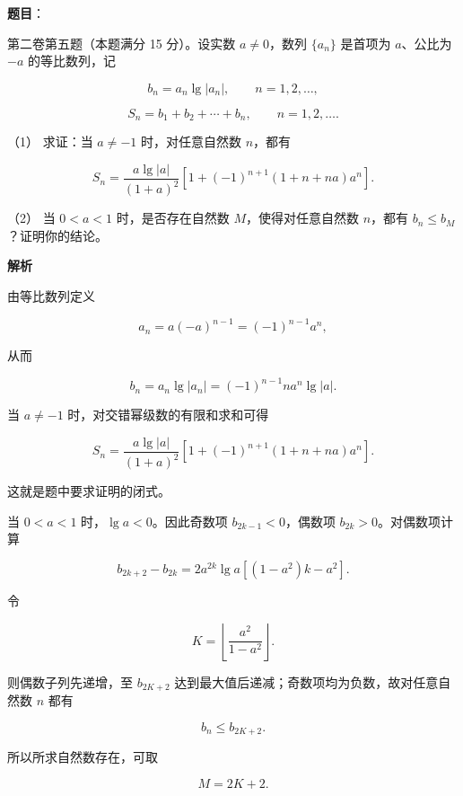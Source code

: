 \begin{answer}

\textbf{题目}：

第二卷第五题（本题满分 15 分）。设实数 $a\ne0$，数列 $\{a_n\}$ 是首项为 $a$、公比为 $-a$ 的等比数列，记

\nopagebreak[4]
\[
b_n=a_n\lg|a_n|,\qquad n=1,2,\ldots,
\]

\nopagebreak[4]
\[
S_n=b_1+b_2+\cdots+b_n,\qquad n=1,2,\ldots.
\]

（1） 求证：当 $a\ne-1$ 时，对任意自然数 $n$，都有

\nopagebreak[4]
\[
S_n=\frac{a\lg|a|}{(1+a)^2}
\left[1+(-1)^{n+1}(1+n+na)a^n\right].
\]

（2） 当 $0<a<1$ 时，是否存在自然数 $M$，使得对任意自然数 $n$，都有 $b_n\leq b_M$？证明你的结论。

\textbf{解析}


由等比数列定义

\nopagebreak[4]
\[
a_n=a(-a)^{n-1}=(-1)^{n-1}a^n,
\]

从而

\nopagebreak[4]
\[
b_n=a_n\lg|a_n|
=(-1)^{n-1}na^n\lg|a|.
\]

当 $a\ne-1$ 时，对交错幂级数的有限和求和可得

\nopagebreak[4]
\[
S_n=\frac{a\lg|a|}{(1+a)^2}
\left[1+(-1)^{n+1}(1+n+na)a^n\right].
\]

这就是题中要求证明的闭式。


当 $0<a<1$ 时，$\lg a<0$。因此奇数项 $b_{2k-1}<0$，偶数项 $b_{2k}>0$。对偶数项计算

\nopagebreak[4]
\[
b_{2k+2}-b_{2k}
=2a^{2k}\lg a\left[(1-a^2)k-a^2\right].
\]

令

\nopagebreak[4]
\[
K=\left\lfloor\frac{a^2}{1-a^2}\right\rfloor.
\]

则偶数子列先递增，至 $b_{2K+2}$ 达到最大值后递减；奇数项均为负数，故对任意自然数 $n$ 都有

\nopagebreak[4]
\[
b_n\le b_{2K+2}.
\]

所以所求自然数存在，可取

\nopagebreak[4]
\[
M=2K+2.
\]



\end{answer}